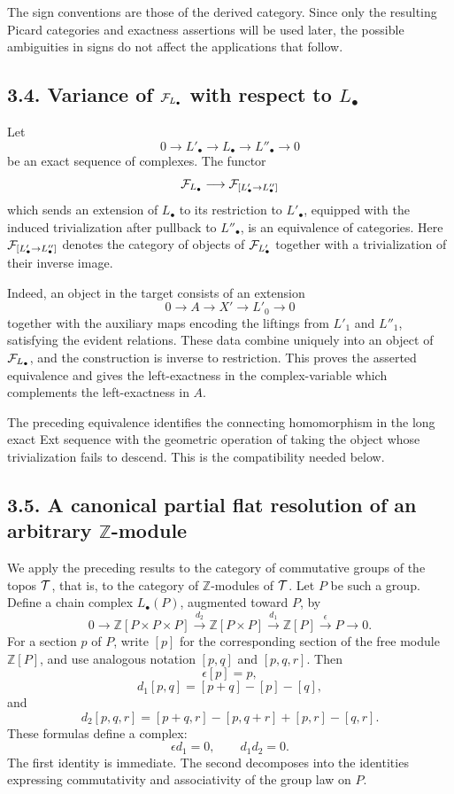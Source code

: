 \documentclass[11pt]{article}
\theoremstyle{plain}
\theoremstyle{definition}
\theoremstyle{remark}
\newcommand{\bZ}{\mathbb Z}
\begin{document}
The sign conventions are those of the derived category. Since only the resulting
Picard categories and exactness assertions will be used later, the possible
ambiguities in signs do not affect the applications that follow.

\subsection*{3.4. Variance of \(\mathcal F_{L_\bullet}\) with respect to \(L_\bullet\)}

Let
\[
0\to L'_\bullet\to L_\bullet\to L''_\bullet\to 0
\]
be an exact sequence of complexes. The functor
\[
\mathcal F_{L_\bullet}\longrightarrow \mathcal F_{[L'_\bullet\to L''_\bullet]}
\]
which sends an extension of \(L_\bullet\) to its restriction to \(L'_\bullet\),
equipped with the induced trivialization after pullback to \(L''_\bullet\), is an
equivalence of categories. Here
\(\mathcal F_{[L'_\bullet\to L''_\bullet]}\) denotes the category of objects of
\(\mathcal F_{L'_\bullet}\) together with a trivialization of their inverse image.

Indeed, an object in the target consists of an extension
\[
0\to A\to X'\to L'_0\to 0
\]
together with the auxiliary maps encoding the liftings from \(L'_1\) and
\(L''_1\), satisfying the evident relations. These data combine uniquely into an
object of \(\mathcal F_{L_\bullet}\), and the construction is inverse to restriction.
This proves the asserted equivalence and gives the left-exactness in the
complex-variable which complements the left-exactness in \(A\).

The preceding equivalence identifies the connecting homomorphism in the long
exact Ext sequence with the geometric operation of taking the object whose
trivialization fails to descend. This is the compatibility needed below.

\subsection*{3.5. A canonical partial flat resolution of an arbitrary \(\bZ\)-module}

We apply the preceding results to the category of commutative groups of the topos
\(\mathcal T\), that is, to the category of \(\bZ\)-modules of \(\mathcal T\). Let \(P\) be
such a group. Define a chain complex \(L_\bullet(P)\), augmented toward \(P\), by
\[
0\longrightarrow \bZ[P\times P\times P]
\xrightarrow{d_2}\bZ[P\times P]
\xrightarrow{d_1}\bZ[P]
\xrightarrow{\epsilon}P\longrightarrow 0.
\]
For a section \(p\) of \(P\), write \([p]\) for the corresponding section of the
free module \(\bZ[P]\), and use analogous notation \([p,q]\) and \([p,q,r]\).
Then
\[
\epsilon[p]=p,
\]
\[
d_1[p,q]=[p+q]-[p]-[q],
\]
and
\[
d_2[p,q,r]=[p+q,r]-[p,q+r]+[p,r]-[q,r].
\]
These formulas define a complex:
\[
\epsilon d_1=0,\qquad d_1d_2=0.
\]
The first identity is immediate. The second decomposes into the identities
expressing commutativity and associativity of the group law on \(P\).
\end{document}
